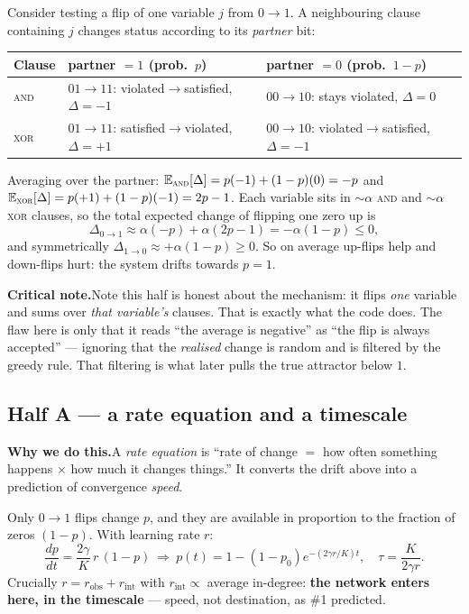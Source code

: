 \documentclass[11pt]{article}
\newcommand{\why}[1]{%
  \par\smallskip\noindent
  \colorbox{blue!8}{\parbox{\dimexpr\linewidth-2\fboxsep}{%
  \textbf{Why we do this.}\quad #1}}\par\smallskip}
\newcommand{\crit}[1]{%
  \par\smallskip\noindent
  \colorbox{red!8}{\parbox{\dimexpr\linewidth-2\fboxsep}{%
  \textbf{Critical note.}\quad #1}}\par\smallskip}
\newcommand{\E}{\mathbb{E}}
\begin{document}
Consider testing a flip of one variable $j$ from $0\to1$. A neighbouring clause containing $j$
changes status according to its \emph{partner} bit:
\begin{center}
\begin{tabular}{lll}
\toprule
Clause & partner $=1$ (prob.\ $p$) & partner $=0$ (prob.\ $1-p$)\\
\midrule
\textsc{and} & $01\!\to\!11$: violated$\to$satisfied, $\Delta=-1$ & $00\!\to\!10$: stays violated, $\Delta=0$\\
\textsc{xor} & $01\!\to\!11$: satisfied$\to$violated, $\Delta=+1$ & $00\!\to\!10$: violated$\to$satisfied, $\Delta=-1$\\
\bottomrule
\end{tabular}
\end{center}
Averaging over the partner: $\E_{\textsc{and}}[\Delta]=p(-1)+(1-p)(0)=-p$ and
$\E_{\textsc{xor}}[\Delta]=p(+1)+(1-p)(-1)=2p-1$. Each variable sits in $\sim\alpha$ \textsc{and}
and $\sim\alpha$ \textsc{xor} clauses, so the total expected change of flipping one zero up is
\begin{equation}
\Delta_{0\to1}\approx \alpha(-p)+\alpha(2p-1)=-\alpha(1-p)\le0,
\end{equation}
and symmetrically $\Delta_{1\to0}\approx+\alpha(1-p)\ge0$. So on average up-flips help and
down-flips hurt: the system drifts towards $p=1$.

\crit{Note this half is honest about the mechanism: it flips \emph{one} variable and sums over
\emph{that variable's} clauses. That is exactly what the code does. The flaw here is only that it
reads ``the average is negative'' as ``the flip is always accepted'' --- ignoring that the
\emph{realised} change is random and is filtered by the greedy rule. That filtering is what later
pulls the true attractor below $1$.}

\subsection{Half A --- a rate equation and a timescale}
\why{A \emph{rate equation} is ``rate of change $=$ how often something happens $\times$ how much it
changes things.'' It converts the drift above into a prediction of convergence \emph{speed}.}

Only $0\to1$ flips change $p$, and they are available in proportion to the fraction of zeros
$(1-p)$. With learning rate $r$:
\begin{equation}
\frac{dp}{dt}=\frac{2\gamma}{K}\,r\,(1-p)
\ \Rightarrow\
p(t)=1-(1-p_0)e^{-(2\gamma r/K)t},\quad \tau=\frac{K}{2\gamma r}.
\end{equation}
Crucially $r=r_{\text{obs}}+r_{\text{int}}$ with $r_{\text{int}}\propto$ average in-degree:
\textbf{the network enters here, in the timescale} --- speed, not destination, as \#1 predicted.
\end{document}
